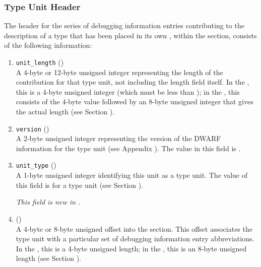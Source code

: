 \subsubsection{Type Unit Header}
\label{datarep:typeunitheader}

The header for the series of debugging information entries
contributing to the description of a type that has been
placed in its own , within the 
\dotdebuginfo{} section,
consists of the following information:
\begin{enumerate}[1. ]

\item \texttt{unit\_length} () \\
A 4-byte or 12-byte unsigned integer 
representing the length
of the \dotdebuginfo{} contribution for that type unit,
not including the length field itself. In the \thirtytwobitdwarfformat, 
this is a 4-byte unsigned integer (which must be
less than \xfffffffzero); in the \sixtyfourbitdwarfformat, this
consists of the 4-byte value \wffffffff followed by an 
8-byte unsigned integer that gives the actual length
(see Section ).

\item  \texttt{version} (\HFTuhalf) \\
A 2-byte unsigned integer representing the version of the
DWARF information for the 
type unit 
(see Appendix ). 
The value in this field is \versiondotdebuginfo.

\item \texttt{unit\_type} (\HFTubyte) \\
A 1-byte unsigned integer identifying this unit as a type unit.
The value of this field is \DWUTtype{} for a type unit
(see Section ).

\textit{This field is new in \DWARFVersionV.}

\item \HFNdebugabbrevoffset{} () \\
A 
4-byte or 8-byte unsigned offset into the 
\dotdebugabbrev{}
section. This offset associates the type unit with a
particular set of debugging information entry abbreviations. In
the \thirtytwobitdwarfformat, this is a 4-byte unsigned length;
in the \sixtyfourbitdwarfformat, this is an 8-byte unsigned length
(see Section ).


\end{enumerate}
